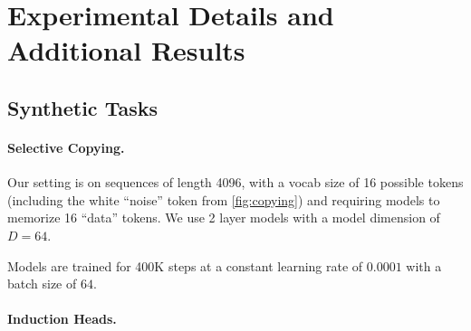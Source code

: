 \section{Experimental Details and Additional Results}
\label{sec:exp-details}


\subsection{Synthetic Tasks}
\label{sec:exp-details:synthetics}

\paragraph{Selective Copying.}

Our setting is on sequences of length 4096, with a vocab size of 16 possible tokens (including the white ``noise'' token from \cref{fig:copying}) and requiring models to memorize 16 ``data'' tokens.
We use 2 layer models with a model dimension of $D = 64$.

Models are trained for 400K steps
at a constant learning rate of $0.0001$
with a batch size of $64$.

\paragraph{Induction Heads.}

